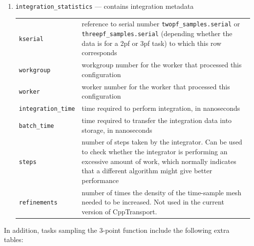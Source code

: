 \documentclass[11pt,a4paper]{article}
\newcommand{\packagefont}{\sffamily}
\newcommand{\CppTransport}{{\packagefont CppTransport}}
\newenvironment{sqltablelist}{\renewcommand{\arraystretch}{1.3}\small}{}
\begin{document}
\begin{sqltablelist}
\begin{enumerate}
        
    \item \texttt{integration_statistics} --- contains integration metadata \\
    \label{sqltables:statistics}
    \begin{tabular}{p{2.5cm}p{11.2cm}}
        \texttt{kserial} & reference to serial number
        \texttt{twopf_samples.serial} or
        \texttt{threepf_samples.serial} (depending whether the data is for
        a 2pf or 3pf task) to which this row corresponds \\
        \texttt{workgroup} & workgroup number for the worker that processed this configuration \\
        \texttt{worker} & worker number for the worker that processed this configuration \\
        \texttt{integration_time} & time required to perform integration, in nanoseconds \\
        \texttt{batch_time} & time required to transfer the integration data into storage, in nanoseconds \\
        \texttt{steps} & number of steps taken by the integrator. Can be used to check whether
        the integrator is performing an excessive amount of work, which normally indicates that a different
        algorithm might give better performance \\
        \texttt{refinements} & number of times the density of the time-sample mesh needed to be
        increased. Not used in the current version of {\CppTransport}.
    \end{tabular}
\end{enumerate}
\end{sqltablelist}
In addition, tasks sampling the 3-point function include the following extra tables:
\end{document}
